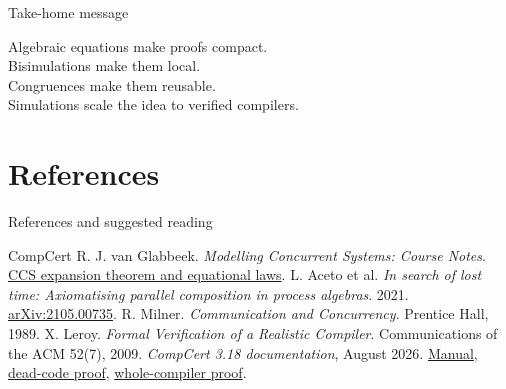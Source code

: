 \documentclass[handout,aspectratio=169,11pt]{beamer}
\begin{document}
\begin{frame}{Take-home message}
  \centering
  \vspace{7mm}
  \begin{exampleblock}{}
    Algebraic equations make proofs compact.\\[2mm]
    Bisimulations make them local.\\[2mm]
    Congruences make them reusable.\\[2mm]
    Simulations scale the idea to verified compilers.
  \end{exampleblock}
\end{frame}

\section{References}
\begin{frame}{References and suggested reading}
  \small
  \begin{thebibliography}{CompCert}
      R. J. van Glabbeek.
      \emph{Modelling Concurrent Systems: Course Notes}.
      \newblock\href{https://homepages.inf.ed.ac.uk/rvangla/MCS/notes.html}{CCS expansion theorem and equational laws}.
      L. Aceto et al.
      \emph{In search of lost time: Axiomatising parallel composition in process algebras}.
      2021.
      \newblock\href{https://arxiv.org/abs/2105.00735}{arXiv:2105.00735}.
      R. Milner. \emph{Communication and Concurrency}.
      Prentice Hall, 1989.
      X. Leroy. \emph{Formal Verification of a Realistic Compiler}.
      Communications of the ACM 52(7), 2009.
      \emph{CompCert 3.18 documentation}, August 2026.
      \newblock\href{https://compcert.org/man/manual001.html}{Manual},
      \href{https://compcert.org/doc/html/compcert.backend.Deadcodeproof.html}{dead-code proof},
      \href{https://compcert.org/doc/html/compcert.driver.Compiler.html}{whole-compiler proof}.
  \end{thebibliography}
\end{frame}
\end{document}
